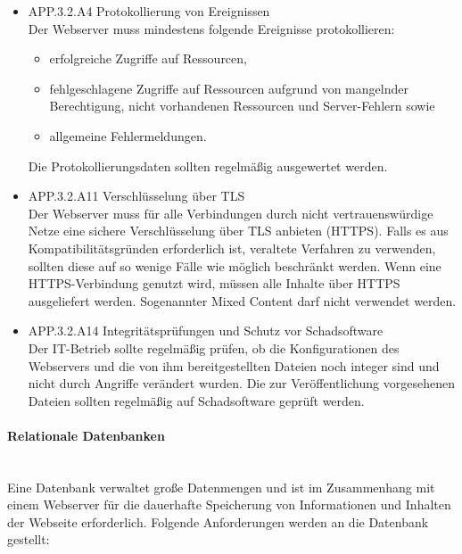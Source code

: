 \begin{itemize}
      \item APP.3.2.A4 Protokollierung von Ereignissen\\
			Der Webserver muss mindestens folgende Ereignisse protokollieren:
\begin{itemize}
\item erfolgreiche Zugriffe auf Ressourcen,
\item fehlgeschlagene Zugriffe auf Ressourcen aufgrund von mangelnder Berechtigung, nicht vorhandenen Ressourcen und Server-Fehlern sowie
\item allgemeine Fehlermeldungen.
\end{itemize}
Die Protokollierungsdaten sollten regelm\"a{\ss}ig ausgewertet werden.\\
			
			\item APP.3.2.A11 Verschl\"usselung \"uber TLS\\
			Der Webserver muss f\"ur alle Verbindungen durch nicht vertrauensw\"urdige Netze eine sichere Verschl\"usselung \"uber \ac{TLS} anbieten (HTTPS). Falls es aus Kompatibilit\"atsgr\"unden erforderlich ist, veraltete Verfahren zu verwenden, sollten diese auf so wenige F\"alle wie m\"oglich beschr\"ankt werden. Wenn eine HTTPS-Verbindung genutzt wird, m\"ussen alle Inhalte \"uber HTTPS ausgeliefert werden. Sogenannter Mixed Content darf nicht verwendet werden.\\
			
			\item APP.3.2.A14 Integrit\"atspr\"ufungen und Schutz vor Schadsoftware\\
			Der IT-Betrieb sollte regelm\"a{\ss}ig pr\"ufen, ob die Konfigurationen des Webservers und die von ihm bereitgestellten Dateien noch integer sind und nicht durch Angriffe ver\"andert wurden. Die zur Ver\"offentlichung vorgesehenen Dateien sollten regelm\"a{\ss}ig auf Schadsoftware gepr\"uft werden.\\
						
   \end{itemize}   

\paragraph{Relationale Datenbanken}
\noindent \\Eine Datenbank verwaltet gro{\ss}e Datenmengen und ist im Zusammenhang mit einem Webserver f\"ur die dauerhafte Speicherung von Informationen und Inhalten der Webseite erforderlich. Folgende Anforderungen werden an die Datenbank gestellt:

